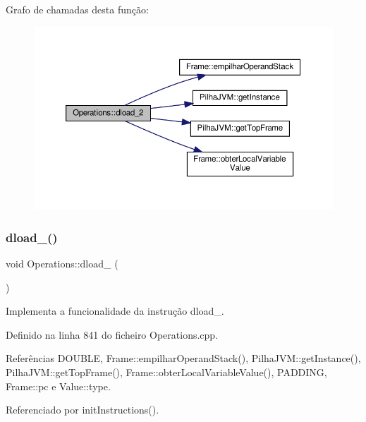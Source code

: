 Grafo de chamadas desta função\+:\nopagebreak
\begin{figure}[H]
\begin{center}
\leavevmode
\includegraphics[width=350pt]{classOperations_a55b89c1780e7f91ad7b6da5747d8c6ba_cgraph}
\end{center}
\end{figure}
\mbox{\label{classOperations_ab3a0a107f5c4a791c71b727142a69523}} 
\subsubsection{\texorpdfstring{dload\+\_()}{dload\_3()}}
{\footnotesize\ttfamily void Operations\+::dload\+\_ (\begin{DoxyParamCaption}{ }\end{DoxyParamCaption})\hspace{0.3cm}{\ttfamily [private]}}



Implementa a funcionalidade da instrução dload\+\_. 



Definido na linha 841 do ficheiro Operations.\+cpp.



Referências D\+O\+U\+B\+LE, Frame\+::empilhar\+Operand\+Stack(), Pilha\+J\+V\+M\+::get\+Instance(), Pilha\+J\+V\+M\+::get\+Top\+Frame(), Frame\+::obter\+Local\+Variable\+Value(), P\+A\+D\+D\+I\+NG, Frame\+::pc e Value\+::type.



Referenciado por init\+Instructions().


